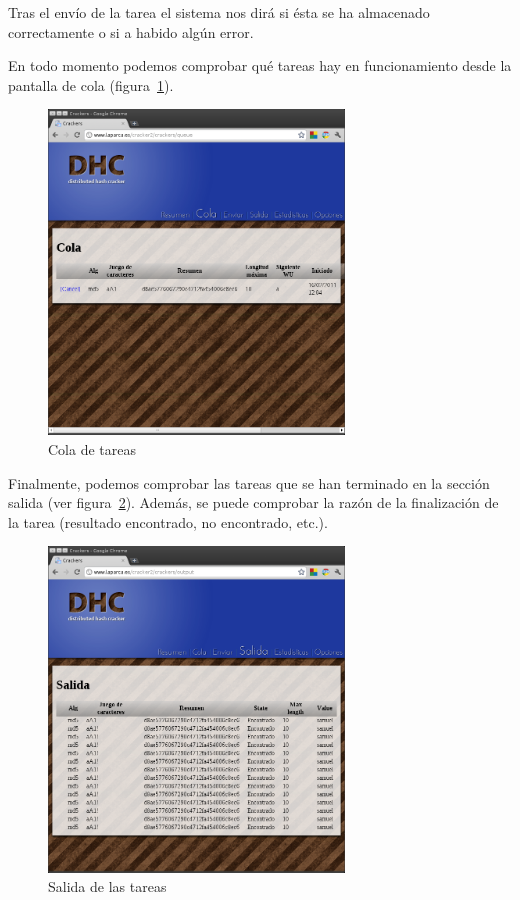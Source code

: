 Tras el envío de la tarea el sistema nos dirá si ésta se ha almacenado correctamente o si a habido algún error.

En todo momento podemos comprobar qué tareas hay en funcionamiento desde la pantalla de cola (figura~\ref{fig:DHC_cola}).

\begin{figure}
	\centering
	\includegraphics[width=0.7\textwidth]{images/cola.png}
	\caption{Cola de tareas}\label{fig:DHC_cola}
\end{figure}

Finalmente, podemos comprobar las tareas que se han terminado en la sección salida (ver figura~\ref{fig:DHC_salida}). Además, se puede comprobar la razón de la finalización de la tarea (resultado encontrado, no encontrado, etc.).

\begin{figure}
	\centering
	\includegraphics[width=0.7\textwidth]{images/salida.png}
	\caption{Salida de las tareas}\label{fig:DHC_salida}
\end{figure}

